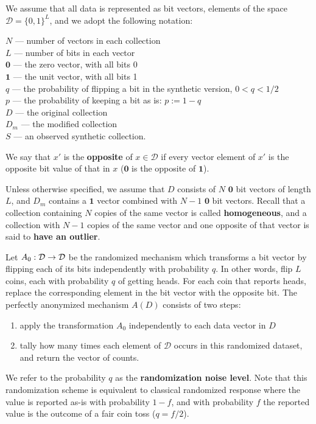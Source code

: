 \documentclass[11pt]{article}
\newcommand{\Dsp}{\mathcal{D}}
\newcommand{\zv}{\textbf{0}}
\newcommand{\uv}{\textbf{1}}
\begin{document}
We assume that all data is represented as bit vectors, elements of the space $\Dsp = \{0,1\}^L$, and we adopt the following notation:

  $N$ --- number of vectors in each collection \\
  $L$ --- number of bits in each vector \\
  $\zv$ --- the zero vector, with all bits 0 \\
  $\uv$ --- the unit vector, with all bits 1 \\
  $q$ --- the probability of flipping a bit in the synthetic version, $0 < q < 1/2$ \\
  $p$ --- the probability of keeping a bit as is: $p := 1-q$ \\
  $D$ --- the original collection \\
  $D_m$ --- the modified collection \\
  $S$ --- an observed synthetic collection.

We say that $x'$ is the \textbf{opposite} of $x\in\Dsp$ if every vector element of $x'$ is the opposite bit value of that in $x$ (\eg $\zv$ is the opposite of $\uv$).

Unless otherwise specified, we assume that $D$ consists of $N$ $\zv$ bit vectors of length $L$, and $D_m$ contains a $\uv$ vector combined with $N-1$ $\zv$ bit vectors. 
Recall that a collection containing $N$ copies of the same vector is called \textbf{homogeneous}, and a collection with $N-1$ copies of the same vector and one opposite of that vector is said to \textbf{have an outlier}.

Let $\map{A_0}{\Dsp}{\Dsp}$ be the randomized mechanism which transforms a bit vector by flipping each of its bits independently with probability $q$. In other words, flip $L$ coins, each with probability $q$ of getting heads. For each coin that reports heads, replace the corresponding element in the bit vector with the opposite bit.
The perfectly anonymized mechanism $A(D)$ consists of two steps:
\begin{enumerate}
\item apply the transformation $A_0$ independently to each data vector in $D$
\item tally how many times each element of $\Dsp$ occurs in this randomized dataset, and return the vector of counts.
\end{enumerate}
We refer to the probability $q$ as the \textbf{randomization noise level}.
Note that this randomization scheme is equivalent to classical randomized response where the value is reported as-is with probability $1-f$, and with probability $f$ the reported value is the outcome of a fair coin toss (\ie $q=f/2$).
\end{document}
